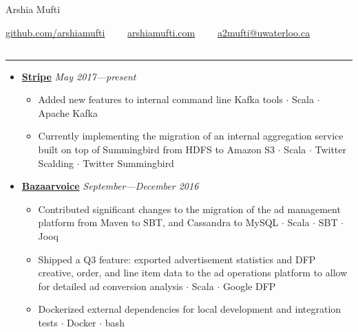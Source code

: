 \documentclass[7pt,letterpaper]{article}
\newcommand{\dt}{$\cdot$ }
\begin{document}
\begin{center}
{\huge Arshia Mufti}


\href{https://github.com/arshiamufti/}{github.com/arshiamufti}\ \ \textbullet
\ \ \href{http://arshiamufti.com}{arshiamufti.com}\ \ \textbullet
\ \ \href{mailto:a2mufti@uwaterloo.ca}{a2mufti@uwaterloo.ca}

\end{center}
\vspace{-2.0em}
\subsection*{}
\hrule
\vspace{1.0em}
  \begin{itemize}
    \parskip=-0.5em
  \itemsep0.6em

    \item[]
    {\href{https://stripe.com}{\textbf{Stripe}} \hfill
      \emph{May 2017---present}}

    \begin{itemize}[label=\textbullet]
      \itemsep0em
      \item Added new features to internal command line Kafka tools \dt Scala 
        \dt Apache Kafka
      \item Currently implementing the migration of an internal aggregation
        service built on top of Summingbird from HDFS to Amazon S3 \dt Scala \dt
        Twitter Scalding \dt Twitter Summingbird
    \end{itemize}

    \item[]
    {\href{http://www.bazaarvoice.com}{\textbf{Bazaarvoice}} \hfill
      \emph{September---December 2016}}

    \begin{itemize}[label=\textbullet]
      \itemsep0em
      \item Contributed significant changes to the migration of the ad
        management platform from Maven to SBT, and Cassandra to MySQL \dt Scala
        \dt SBT \dt Jooq
      \item Shipped a Q3 feature: exported advertisement statistics and DFP
        creative, order, and line item data to the ad operations platform to
        allow for detailed ad conversion analysis \dt Scala \dt Google DFP
      \item Dockerized external dependencies for local development and
        integration tests \dt Docker \dt bash
    \end{itemize}


\end{itemize}
\end{document}
